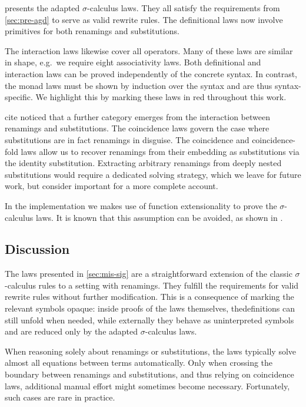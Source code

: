 \documentclass[screen,nonacm]{acmart}
\begin{document}
 presents the adapted $\sigma$-calculus laws. They all
satisfy the requirements from \cref{sec:pre-agd} to serve as valid rewrite
rules. The definitional laws now involve primitives for both renamings and
substitutions.

The interaction laws likewise cover all operators. Many of these laws are
similar in shape, e.g.\ we require eight associativity laws. Both definitional
and interaction laws can be proved independently of the concrete syntax. In
contrast, the monad laws must be shown by induction over the syntax and are
thus syntax-specific. We highlight this by marking these laws in red throughout
this work.

cite noticed that a further category emerges from the interaction between
renamings and substitutions. The coincidence laws govern the case where
substitutions are in fact renamings in disguise. The coincidence and
coincidence-fold laws allow us to recover renamings from their embedding as
substitutions via the identity substitution. Extracting arbitrary renamings
from deeply nested substitutions would require a dedicated solving strategy,
which we leave for future work, but consider important for a more complete
account.

In the implementation we makes use of function extensionality to prove the
$\sigma$-calculus laws. It is known that this assumption can be avoided, as
shown in \cite{...}.

\subsection{Discussion}\label{sec:mis-dis}
The laws presented in \cref{sec:mis-sig} are a straightforward extension of the
classic $\sigma$-calculus rules to a setting with renamings. They fulfill the
requirements for valid rewrite rules without further modification. This is a
consequence of marking the relevant symbols opaque: inside proofs of the laws
themselves, thedefinitions can still unfold when needed, while externally they
behave as uninterpreted symbols and are reduced only by the adapted
$\sigma$-calculus laws.

When reasoning solely about renamings or substitutions, the laws typically
solve almost all equations between terms automatically. Only when crossing the
boundary between renamings and substitutions, and thus relying on coincidence
laws, additional manual effort might sometimes become necessary. Fortunately,
such cases are rare in practice.
\end{document}
